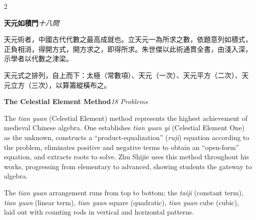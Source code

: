 \documentclass[11pt,a4paper]{article}
\begin{document}
\begin{paracol}{2}
\begin{leftcolumn}
\noindent\textbf{天元如積門}\quad\textit{十八問}

天元術者，中國古代代數之最高成就也。立天元一為所求之數，依題意列如積式，正負相消，得開方式，開方求之，即得所求。朱世傑以此術通貫全書，由淺入深，示學者以代數之津梁。

天元式之排列，自上而下：太極（常數項）、天元（一次）、天元平方（二次）、天元立方（三次），以算籌縱橫布之。
\end{leftcolumn}

\switchcolumn

\noindent\textbf{The Celestial Element Method}\quad\textit{18 Problems}

The \textit{tian yuan} (Celestial Element) method represents the highest achievement of medieval Chinese algebra. One establishes \textit{tian yuan yi} (Celestial Element One) as the unknown, constructs a ``product-equalization'' (\textit{ruji}) equation according to the problem, eliminates positive and negative terms to obtain an ``open-form'' equation, and extracts roots to solve. Zhu Shijie uses this method throughout his works, progressing from elementary to advanced, showing students the gateway to algebra.

The \textit{tian yuan} arrangement runs from top to bottom: the \textit{taiji} (constant term), \textit{tian yuan} (linear term), \textit{tian yuan} square (quadratic), \textit{tian yuan} cube (cubic), laid out with counting rods in vertical and horizontal patterns.
\end{paracol}

\vspace{0.5cm}
\end{document}
